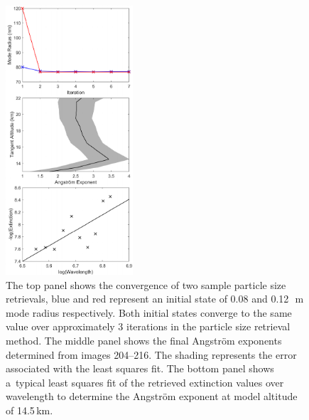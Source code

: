 \documentclass[amtd, online, hvmath]{copernicus}
\begin{document}
\begin{figure}
\includegraphics[height=100mm]{amt-2015-329-discussions-f13.pdf}
\caption{The top panel shows the convergence of two sample particle
  size retrievals, blue and red represent an initial state of 0.08 and
  0.12\,\unit{{\mu}m} mode radius respectively. Both initial states
  converge to the same value over approximately 3 iterations in the
  particle size retrieval method. The middle panel shows the final
  Angstr\"{o}m exponents determined from images 204--216. The shading
  represents the error associated with the least squares fit. The
  bottom panel shows a~typical least squares fit of the retrieved
  extinction values over wavelength to determine the Angstr\"{o}m
  exponent at model altitude of 14.5\,\unit{km}.}
\label{amtd-2015-0329-f13.pdf}
\end{figure}
\end{document}
